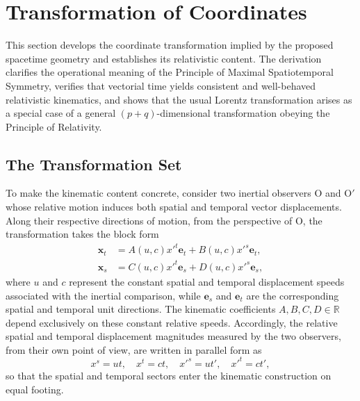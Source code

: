 
\section{Transformation of Coordinates}
\label{ch_Transformation_of_coordinates}
This section develops the coordinate transformation implied by the proposed spacetime geometry and establishes its relativistic content. The derivation clarifies the operational meaning of the Principle of Maximal Spatiotemporal Symmetry, verifies that vectorial time yields consistent and well-behaved relativistic kinematics, and shows that the usual Lorentz transformation arises as a special case of a general $(p+q)$-dimensional transformation obeying the Principle of Relativity.

\subsection{The Transformation Set}
To make the kinematic content concrete, consider two inertial observers $\mathrm{O}$ and $\mathrm{O}'$ whose relative motion induces both spatial and temporal vector displacements. Along their respective directions of motion, from the perspective of $\mathrm{O}$, the transformation takes the block form
\begin{subequations}
\begin{align}
    \mathbf{x}_{t} &= A(u,c)x'^{t}\mathbf{e}_{t} + B(u,c)x'^{s}\mathbf{e}_{t},\\
    \mathbf{x}_{s} &= C(u,c)x'^{t}\mathbf{e}_{s} + D(u,c)x'^{s}\mathbf{e}_{s},
\end{align}
\end{subequations}
where $u$ and $c$ represent the constant spatial and temporal displacement speeds associated with the inertial comparison, while $\mathbf{e}_{s}$ and $\mathbf{e}_{t}$ are the corresponding spatial and temporal unit directions. The kinematic coefficients $A, B, C, D \in \mathbb{R}$ depend exclusively on these constant relative speeds. Accordingly, the relative spatial and temporal displacement magnitudes measured by the two observers, from their own point of view, are written in parallel form as
\begin{equation}
    x^{s} = ut,\quad x^{t} = ct,\quad x'^{s} = ut',\quad x'^{t} = ct',
\end{equation}
so that the spatial and temporal sectors enter the kinematic construction on equal footing.

